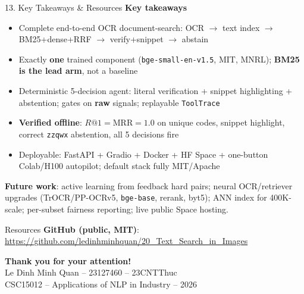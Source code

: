 \documentclass[10pt,aspectratio=169]{beamer}
\begin{document}
\begin{frame}{13. Key Takeaways \& Resources}
\textbf{Key takeaways}
\begin{itemize}\small
  \item Complete end-to-end OCR document-search: OCR $\to$ text index $\to$ BM25+dense+RRF $\to$ verify+snippet $\to$ abstain
  \item Exactly \textbf{one} trained component (\texttt{bge-small-en-v1.5}, MIT, MNRL); \textbf{BM25 is the lead arm}, not a baseline
  \item Deterministic 5-decision agent: literal verification + snippet highlighting + abstention; gates on \textbf{raw} signals; replayable \texttt{ToolTrace}
  \item \textbf{Verified offline}: $R@1{=}\text{MRR}{=}1.0$ on unique codes, snippet highlight, correct \texttt{zzqwx} abstention, all 5 decisions fire
  \item Deployable: FastAPI + Gradio + Docker + HF Space + one-button Colab/H100 autopilot; default stack fully MIT/Apache
\end{itemize}

\textbf{Future work}: active learning from feedback hard pairs; neural OCR/retriever upgrades (TrOCR/PP-OCRv5, \texttt{bge-base}, rerank, byt5); ANN index for 400K-scale; per-subset fairness reporting; live public Space hosting.

\begin{block}{Resources}
\centering
\small \textbf{GitHub (public, MIT)}: \url{https://github.com/ledinhminhquan/20_Text_Search_in_Images}
\end{block}

\vspace{0.15cm}
\centering
\Large\textbf{Thank you for your attention!}\\[0.15cm]
\normalsize Le Dinh Minh Quan -- 23127460 -- 23CNTThuc \\
\small CSC15012 -- Applications of NLP in Industry -- 2026
\end{frame}
\end{document}
